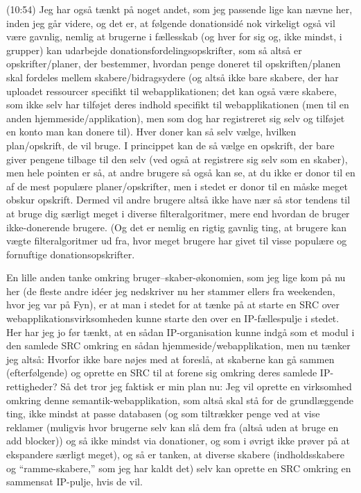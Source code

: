 \documentclass{report}
\begin{document}
(10:54) Jeg har også tænkt på noget andet, som jeg passende lige kan nævne her, inden jeg går videre, og det er, at følgende donationsidé nok virkeligt også vil være gavnlig, nemlig at brugerne i fællesskab (og hver for sig og, ikke mindst, i grupper) kan udarbejde donationsfordelingsopskrifter, som så altså er opskrifter/planer, der bestemmer, hvordan penge doneret til opskriften/planen skal fordeles mellem skabere/bidragsydere (og altså ikke bare skabere, der har uploadet ressourcer specifikt til webapplikationen; det kan også være skabere, som ikke selv har tilføjet deres indhold specifikt til webapplikationen (men til en anden hjemmeside/applikation), men som dog har registreret sig selv og tilføjet en konto man kan donere til). Hver doner kan så selv vælge, hvilken plan/opskrift, de vil bruge. I princippet kan de så vælge en opskrift, der bare giver pengene tilbage til den selv (ved også at registrere sig selv som en skaber), men hele pointen er så, at andre brugere så også kan se, at du ikke er donor til en af de mest populære planer/opskrifter, men i stedet er donor til en måske meget obskur opskrift. Dermed vil andre brugere altså ikke have nær så stor tendens til at bruge dig særligt meget i diverse filteralgoritmer, mere end hvordan de bruger ikke-donerende brugere. (Og det er nemlig en rigtig gavnlig ting, at brugere kan vægte filteralgoritmer ud fra, hvor meget brugere har givet til visse populære og fornuftige donationsopskrifter. 

En lille anden tanke omkring bruger--skaber-økonomien, som jeg lige kom på nu her (de fleste andre idéer jeg nedskriver nu her stammer ellers fra weekenden, hvor jeg var på Fyn), er at man i stedet for at tænke på at starte en SRC over webapplikationsvirksomheden kunne starte den over en IP-fællespulje i stedet. Her har jeg jo før tænkt, at en sådan IP-organisation kunne indgå som et modul i den samlede SRC omkring en sådan hjemmeside/webapplikation, men nu tænker jeg altså: Hvorfor ikke bare nøjes med at foreslå, at skaberne kan gå sammen (efterfølgende) og oprette en SRC til at forene sig omkring deres samlede IP-rettigheder? Så det tror jeg faktisk er min plan nu: Jeg vil oprette en virksomhed omkring denne semantik-webapplikation, som altså skal stå for de grundlæggende ting, ikke mindst at passe databasen (og som tiltrækker penge ved at vise reklamer (muligvis hvor brugerne selv kan slå dem fra (altså uden at bruge en add blocker)) og så ikke mindst via donationer, og som i øvrigt ikke prøver på at ekspandere særligt meget), og så er tanken, at diverse skabere (indholdsskabere og ``ramme-skabere,'' som jeg har kaldt det) selv kan oprette en SRC omkring en sammensat IP-pulje, hvis de vil. 
\end{document}
